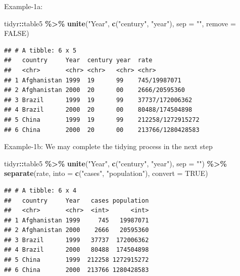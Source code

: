 \documentclass[
]{book}
\newenvironment{Shaded}{\begin{snugshade}}{\end{snugshade}}
\newcommand{\AttributeTok}[1]{\textcolor[rgb]{0.13,0.29,0.53}{#1}}
\newcommand{\ConstantTok}[1]{\textcolor[rgb]{0.56,0.35,0.01}{#1}}
\newcommand{\FunctionTok}[1]{\textcolor[rgb]{0.13,0.29,0.53}{\textbf{#1}}}
\newcommand{\NormalTok}[1]{#1}
\newcommand{\SpecialCharTok}[1]{\textcolor[rgb]{0.81,0.36,0.00}{\textbf{#1}}}
\newcommand{\StringTok}[1]{\textcolor[rgb]{0.31,0.60,0.02}{#1}}
\begin{document}
Example-1a:

\begin{Shaded}
\begin{Highlighting}[]
\NormalTok{tidyr}\SpecialCharTok{::}\NormalTok{table5 }\SpecialCharTok{\%\textgreater{}\%} 
  \FunctionTok{unite}\NormalTok{(}\StringTok{"Year"}\NormalTok{,}
        \FunctionTok{c}\NormalTok{(}\StringTok{"century"}\NormalTok{, }\StringTok{"year"}\NormalTok{), }
        \AttributeTok{sep =} \StringTok{""}\NormalTok{,}
        \AttributeTok{remove =} \ConstantTok{FALSE}\NormalTok{)}
\end{Highlighting}
\end{Shaded}

\begin{verbatim}
## # A tibble: 6 x 5
##   country     Year  century year  rate             
##   <chr>       <chr> <chr>   <chr> <chr>            
## 1 Afghanistan 1999  19      99    745/19987071     
## 2 Afghanistan 2000  20      00    2666/20595360    
## 3 Brazil      1999  19      99    37737/172006362  
## 4 Brazil      2000  20      00    80488/174504898  
## 5 China       1999  19      99    212258/1272915272
## 6 China       2000  20      00    213766/1280428583
\end{verbatim}

Example-1b:
We may complete the tidying process in the next step

\begin{Shaded}
\begin{Highlighting}[]
\NormalTok{tidyr}\SpecialCharTok{::}\NormalTok{table5 }\SpecialCharTok{\%\textgreater{}\%} 
  \FunctionTok{unite}\NormalTok{(}\StringTok{"Year"}\NormalTok{,}
        \FunctionTok{c}\NormalTok{(}\StringTok{"century"}\NormalTok{, }\StringTok{"year"}\NormalTok{), }
        \AttributeTok{sep =} \StringTok{""}\NormalTok{) }\SpecialCharTok{\%\textgreater{}\%} 
  \FunctionTok{separate}\NormalTok{(rate, }
           \AttributeTok{into =} \FunctionTok{c}\NormalTok{(}\StringTok{"cases"}\NormalTok{, }\StringTok{"population"}\NormalTok{),}
           \AttributeTok{convert =} \ConstantTok{TRUE}\NormalTok{)}
\end{Highlighting}
\end{Shaded}

\begin{verbatim}
## # A tibble: 6 x 4
##   country     Year   cases population
##   <chr>       <chr>  <int>      <int>
## 1 Afghanistan 1999     745   19987071
## 2 Afghanistan 2000    2666   20595360
## 3 Brazil      1999   37737  172006362
## 4 Brazil      2000   80488  174504898
## 5 China       1999  212258 1272915272
## 6 China       2000  213766 1280428583
\end{verbatim}
\end{document}
